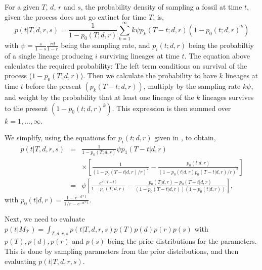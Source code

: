 \documentclass[11pt]{article}
\begin{document}
For a given $T$, $d$, $r$ and $s$, the probability density of sampling a fossil at time $t$, given the process does not go extinct for time $T$, is,
$$p(t|T,d,r,s) = \frac{1}{1-p_0(T;d,r)} \sum_{k=1}^\infty k \psi p_k(T-t;d,r) (1-p_0(t;d,r)^k)$$
with $\psi=\frac{s}{1-s} \frac{rd}{1-r}$ being the sampling rate, and $p_i(t;d,r)$ being the probabiltiy of a single lineage producing $i$ surviving lineages at time $t$.
The equation above calculates the required probability: The left term conditions on survival of the process ($1-p_0(T;d,r)$). Then we calculate the probability to have $k$ lineages at time $t$ before the present $( p_k(T-t;d,r))$, multiply by the sampling rate $k \psi$, and weight by the probability that at least one lineage of the $k$ lineages survives to the present $ (1-p_0(t;d,r)^k)$. This expression is then summed over $k=1,\ldots, \infty$.

We simplify, using the equations for $p_i(t;d,r)$ given in \cite{kendall1948}, to obtain,
\begin{eqnarray*}
p(t|T,d,r,s) &=& \frac{1}{1-p_0(T;d,r)}  \psi p_1(T-t|d,r) \\ & & \times \left[  \frac{1}{(1-p_0(T-t|d,r)/r)^2} - \frac{p_0(t|d,r)}{(1-p_0(t|d,r) p_0(T-t|d,r)/r)^2}  \right]\\
&=&  \psi  \left[ \frac{e^{d(T-t)}}{1-p_0(T;d,r)} - \frac{p_0(T|d,r)-p_0(T-t|d,r)}{(1-p_0(T-t|d,r))(1-p_0(t|d,r))} \right],
\end{eqnarray*}
with $p_0(t|d,r) = \frac{1-e^{-d*t}}{1/r - e^{-d*t}}$.

Next, we need to evaluate $p(t|M_\mathcal{T}) = \int_{T,d,r,s} p(t|T,d,r,s) p(T) p(d) p(r) p(s)$ with $p(T), p(d), p(r)$ and $p(s)$ being the prior distributions for the parameters. This is done by sampling parameters from the prior distributions, and then evaluating $p(t|T,d,r,s)$. 
\end{document}
